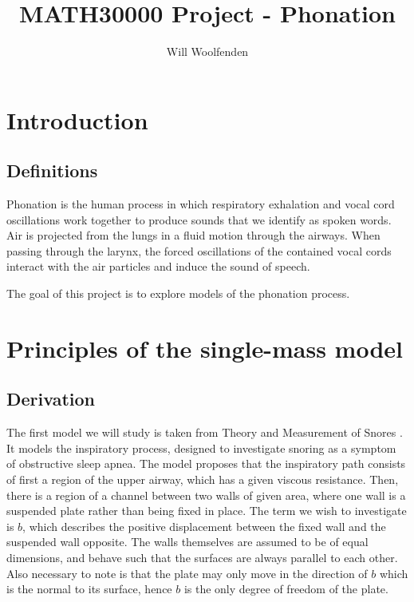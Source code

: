 \documentclass{article}
\title{MATH30000 Project - Phonation}
\author{Will Woolfenden}
\begin{document}
\maketitle

\section{Introduction}

\subsection{Definitions}

Phonation is the human process in which respiratory exhalation and vocal cord oscillations work together to produce sounds that we identify as spoken words.
Air is projected from the lungs in a fluid motion through the airways.
When passing through the larynx, the forced oscillations of the contained vocal cords interact with the air particles and induce the sound of speech.

The goal of this project is to explore models of the phonation process.



\section{Principles of the single-mass model}

\subsection{Derivation}

The first model we will study is taken from Theory and Measurement of Snores \cite{gavriely_jensen_1993}.
It models the inspiratory process, designed to investigate snoring as a symptom of obstructive sleep apnea.
The model proposes that the inspiratory path consists of first a region of the upper airway,
which has a given viscous resistance.
Then, there is a region of a channel between two walls of given area, where one wall is a suspended plate rather than being fixed in place.
The term we wish to investigate is $b$, which describes the positive displacement between the fixed wall and the suspended wall opposite. 
The walls themselves are assumed to be of equal dimensions, and behave such that the surfaces are always parallel to each other.
Also necessary to note is that the plate may only move in the direction of $b$ which is the normal to its surface,
hence $b$ is the only degree of freedom of the plate.
\end{document}
